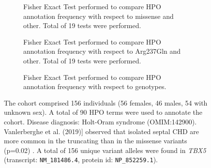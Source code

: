 \begin{figure}[htbp]
\begin{subfigure}[b]{0.95\textwidth}
\centering
{}
\captionsetup{justification=raggedright,singlelinecheck=false}
\caption{Fisher Exact Test performed to compare HPO annotation frequency with respect to missense and other. Total of
        19 tests were performed.}
\end{subfigure}
\vspace{2em}
\begin{subfigure}[b]{0.95\textwidth}
\centering
{}
\captionsetup{justification=raggedright,singlelinecheck=false}
\caption{Fisher Exact Test performed to compare HPO annotation frequency with respect to Arg237Gln and other. Total of
        19 tests were performed.}
\end{subfigure}
\vspace{2em}
\begin{subfigure}[b]{0.95\textwidth}
\centering
{}
\captionsetup{justification=raggedright,singlelinecheck=false}
\caption{Fisher Exact Test performed to compare HPO annotation frequency with respect to genotypes.}
\end{subfigure}

\vspace{2em}

\caption{ The cohort comprised 156 individuals (56 females, 46 males, 54 with unknown sex). 
A total of 90 HPO terms were used to annotate the cohort. Disease diagnosis: Holt-Oram syndrome (OMIM:142900).
Vanlerberghe et al. (2019)] observed that isolated septal CHD are more common in the truncating than in 
the missense variants (p=0.02) \cite{PMID_30552424}.
A total of 156 unique variant alleles were found in \textit{TBX5} (transcript: \texttt{NM\_181486.4}, protein id: \texttt{NP\_852259.1}).}
\end{figure}
